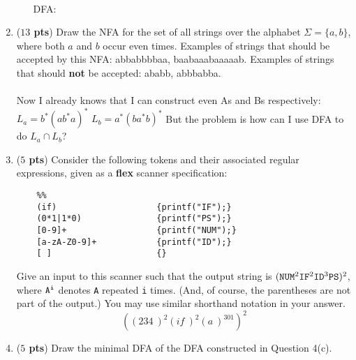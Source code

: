 \documentclass[10pt]{article}
\newcommand {\pts}[1]{({\bf #1 pts})}
\begin{document}
\begin{enumerate}
\begin{enumerate}
	\\
	DFA:
	\\
	\begin{tikzpicture}[shorten >=1pt,node distance=2.6cm,on grid,auto]
	\end{tikzpicture}
  \end{enumerate}

   \newpage
  \item \pts{$13$} Draw the NFA for the set of all strings over the alphabet $\Sigma = \{a,b\}$, where both $a$ and $b$ occur even times.
Examples of strings that should be accepted by this NFA: abbabbbbaa, baabaaabaaaaab.
Examples of strings that should \textbf{not} be accepted: ababb, abbbabba.
	\\
	\\
		Now I already knows that I can construct even As and Bs respectively:
		$	L_a = b^*(ab^*a)^*  $
		$	L_b = a^*(ba^*b)^*  $
		But the problem is how can I use DFA to do $ L_a \cap L_b$?
	\begin{tikzpicture}[shorten >=1pt,node distance=2cm,on grid,auto]

	\end{tikzpicture}

  \newpage
   \item \pts{$5$} Consider the following tokens and their associated regular expressions, given as a \textbf{flex} scanner specification:

  \begin{lstlisting}
	%%
	(if)                    {printf("IF");}
	(0*1|1*0)               {printf("PS");}
	[0-9]+                  {printf("NUM");}
	[a-zA-Z0-9]+            {printf("ID");}
	[ ]                     {}
  \end{lstlisting}

  Give an input to this scanner such that the output string is $\tt (NUM^{\rm 2} IF^{\rm 2} ID^{\rm 3} PS)^{\rm 2}$, where $\tt A^i$ denotes {\tt A} repeated {\tt i} times.   (And, of course, the parentheses are not part of the output.)  You may use similar shorthand notation in your answer.
  \[
	((234\ )^2(if\ )^2(a\ )^301)^2
  \]

  \newpage
  \item \pts{$5$} Draw the minimal DFA of the DFA constructed in Question 4(c).
   \\
	\\
	\begin{tikzpicture}[shorten >=1pt,node distance=2cm,on grid,auto]
	\end{tikzpicture}

\end{enumerate}
\end{document}

